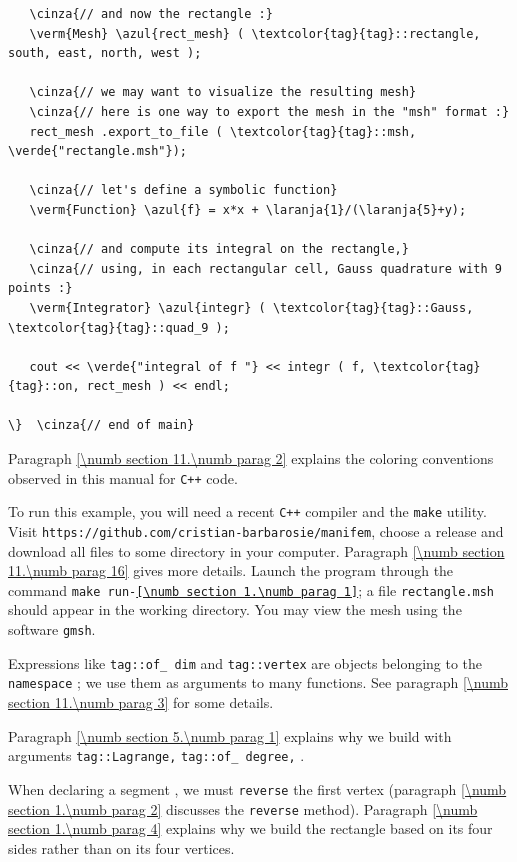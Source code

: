 \begin{Verbatim}
   \cinza{// and now the rectangle :}
   \verm{Mesh} \azul{rect_mesh} ( \textcolor{tag}{tag}::rectangle, south, east, north, west );

   \cinza{// we may want to visualize the resulting mesh}
   \cinza{// here is one way to export the mesh in the "msh" format :}
   rect_mesh .export_to_file ( \textcolor{tag}{tag}::msh, \verde{"rectangle.msh"});

   \cinza{// let's define a symbolic function}
   \verm{Function} \azul{f} = x*x + \laranja{1}/(\laranja{5}+y);

   \cinza{// and compute its integral on the rectangle,}
   \cinza{// using, in each rectangular cell, Gauss quadrature with 9 points :}
   \verm{Integrator} \azul{integr} ( \textcolor{tag}{tag}::Gauss, \textcolor{tag}{tag}::quad_9 );

   cout << \verde{"integral of f "} << integr ( f, \textcolor{tag}{tag}::on, rect_mesh ) << endl;

\}  \cinza{// end of main}
\end{Verbatim}

Paragraph \ref{\numb section 11.\numb parag 2} explains the coloring conventions observed
in this manual for {\tt C++} code.

To run this example, you will need a recent {\tt C++} compiler and the {\tt make} utility.
Visit {\small\tt https://github.com/cristian-barbarosie/manifem}, choose a release
and download all files to some directory in your computer.
Paragraph \ref{\numb section 11.\numb parag 16} gives more details.
Launch the program through the command
{\small\tt make run-\ref{\numb section 1.\numb parag 1}};
a file {\small\tt rectangle.msh} should appear in the working directory.
You may view the mesh using the software {\tt gmsh}.

Expressions like {\small\tt\textcolor{tag}{tag}::of\_\,dim} and
{\small\tt\textcolor{tag}{tag}::vertex} are
objects belonging to the {\small\tt namespace} {\small\tt{}};
we use them as arguments to many functions.
See paragraph \ref{\numb section 11.\numb parag 3} for some details.

Paragraph \ref{\numb section 5.\numb parag 1} explains why we build {\small\tt{}}
{\small\tt{}} with arguments {\small\tt\textcolor{tag}{tag}::Lagrange,}\hfil\break
{\small\tt\textcolor{tag}{tag}::of\_\,degree,} {\small\tt{}}.

When declaring a segment {\small\tt{}}, we must {\small\tt reverse} the first vertex
(paragraph \ref{\numb section 1.\numb parag 2} discusses the {\small\tt reverse} method).
Paragraph \ref{\numb section 1.\numb parag 4} explains why we build
the rectangle based on its four sides rather than on its four vertices.

